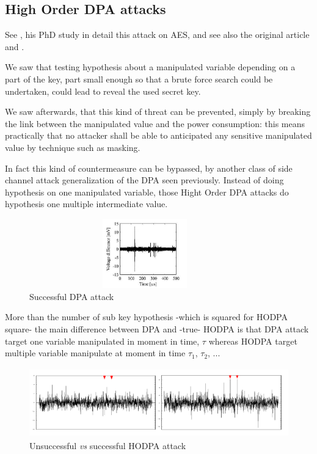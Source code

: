 \newpage
\subsection{High Order DPA attacks}
\label{High_Order_DPA_attacks}


See \cite{phd-Giraud-2007}, his PhD study in detail this attack on AES, 
and see also the original article \cite{fse-2003-akkar} and \cite{ches-2001-akkar}.

We saw that testing hypothesis about a manipulated variable depending on a part of
the key, part small enough so that a brute force search could be 
undertaken, could lead to reveal the used secret key.

We saw afterwards, that this kind of threat can be prevented, simply by breaking 
the link between the manipulated value and the power consumption: this means
practically that no attacker shall be able to anticipated any sensitive manipulated 
value by technique such as masking.

In fact this kind of countermeasure can be bypassed, by another class of side 
channel attack generalization of the DPA seen previously. Instead of doing hypothesis
on one manipulated variable, those Hight Order DPA attacks do hypothesis one multiple 
intermediate value.

      \begin{figure}[!h]
        \centering
        \includegraphics[width=10cm,height=3cm]{images/dpa_result.png}
        \caption{Successful DPA attack}
      \end{figure}	
      
More than the number of sub key hypothesis -which is squared for HODPA square- the 
main difference between DPA and -true- HODPA is that DPA attack 
target one variable manipulated in moment in time, $\tau$ whereas HODPA 
target multiple variable manipulate at moment in time $\tau_1$, $\tau_2$, ...

      \begin{figure}[!h]
        \centering
		\includegraphics[width=14cm,height=3cm]{images/hodpa_result.png}
		\caption{Unsuccessful \textit{vs} successful HODPA attack}
      \end{figure}	

